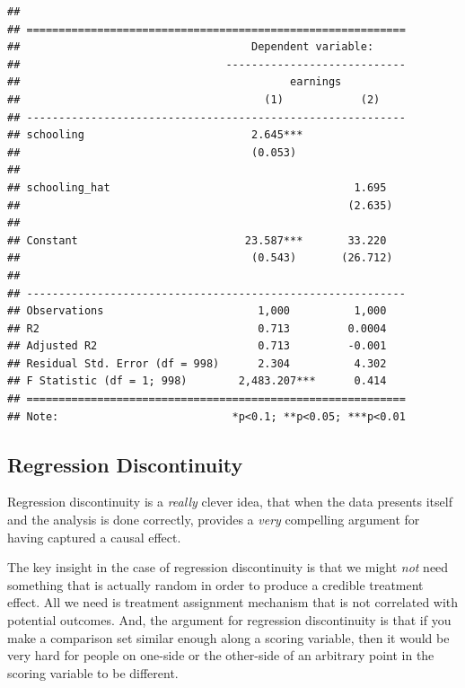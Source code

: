 \documentclass[
]{article}
\theoremstyle{definition}
\theoremstyle{definition}
\theoremstyle{definition}
\theoremstyle{definition}
\theoremstyle{remark}
\begin{document}
\begin{verbatim}
## 
## ===========================================================
##                                    Dependent variable:     
##                                ----------------------------
##                                          earnings          
##                                      (1)            (2)    
## -----------------------------------------------------------
## schooling                          2.645***                
##                                    (0.053)                 
##                                                            
## schooling_hat                                      1.695   
##                                                   (2.635)  
##                                                            
## Constant                          23.587***       33.220   
##                                    (0.543)       (26.712)  
##                                                            
## -----------------------------------------------------------
## Observations                        1,000          1,000   
## R2                                  0.713         0.0004   
## Adjusted R2                         0.713         -0.001   
## Residual Std. Error (df = 998)      2.304          4.302   
## F Statistic (df = 1; 998)        2,483.207***      0.414   
## ===========================================================
## Note:                           *p<0.1; **p<0.05; ***p<0.01
\end{verbatim}

\subsection{Regression Discontinuity}\label{regression-discontinuity}

Regression discontinuity is a \emph{really} clever idea, that when the data presents itself and the analysis is done correctly, provides a \emph{very} compelling argument for having captured a causal effect.

The key insight in the case of regression discontinuity is that we might \emph{not} need something that is actually random in order to produce a credible treatment effect. All we need is treatment assignment mechanism that is not correlated with potential outcomes. And, the argument for regression discontinuity is that if you make a comparison set similar enough along a scoring variable, then it would be very hard for people on one-side or the other-side of an arbitrary point in the scoring variable to be different.
\end{document}
